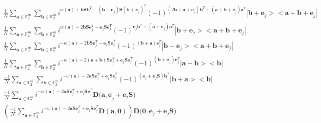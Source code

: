 \documentclass{article}
\begin{document}
\begin{align*}
	&\frac{1}{N}\sum_{\mathbf{a} \in \mathbb{F}^m_2}{\sum_{\mathbf{b} \in \mathbb{F}^m_2}{i^{w(\mathbf{a})+\mathbf{b S b}^T -(\mathbf{b+e}_j)\mathbf{S}(\mathbf{b+e}_j)^T} (-1)^{(2\mathbf{b}+\mathbf{a+e}_j)\mathbf{b}^T+(\mathbf{a+b+e}_j)\mathbf{a}^T} |\mathbf{b+e}_j> <\mathbf{a+b+e}_j |    } } \\
	&\frac{1}{N}\sum_{\mathbf{a} \in \mathbb{F}^m_2}{\sum_{\mathbf{b} \in \mathbb{F}^m_2}{i^{w(\mathbf{a})-2\mathbf{b S }\mathbf{e}_j^T-\mathbf{e}_j \mathbf{S e}_j^T} (-1)^{\mathbf{e}_j\mathbf{b}^T+(\mathbf{a+e}_j)\mathbf{a}^T} |\mathbf{b+e}_j> <\mathbf{a+b+e}_j |    } }\\
	&\frac{1}{N}\sum_{\mathbf{a} \in \mathbb{F}^m_2}{\sum_{\mathbf{b} \in \mathbb{F}^m_2}{i^{-w(\mathbf{a})-2\mathbf{b S }\mathbf{e}_j^T-\mathbf{e}_j \mathbf{S e}_j^T} (-1)^{(\mathbf{b+a})\mathbf{e}_j^T} |\mathbf{b+e}_j> <\mathbf{a+b+e}_j |    } } \\
	& \frac{1}{N}\sum_{\mathbf{a} \in \mathbb{F}^m_2}{\sum_{\mathbf{b} \in \mathbb{F}^m_2}{i^{-w(\mathbf{a})-2\mathbf{(a+b) S }\mathbf{e}_j^T+\mathbf{e}_j \mathbf{S e}_j^T} (-1)^{(\mathbf{b+e}_j)\mathbf{e}_j^T} |\mathbf{a+b}> <\mathbf{b} |    } } \\
	& \frac{-1}{N}\sum_{\mathbf{a} \in \mathbb{F}^m_2}{\sum_{\mathbf{b} \in \mathbb{F}^m_2}{i^{-w(\mathbf{a})-2\mathbf{a S }\mathbf{e}_j^T+\mathbf{e}_j \mathbf{S e}_j^T} (-1)^{(\mathbf{e}_j+\mathbf{e}_j\mathbf{S})\mathbf{b}^T} |\mathbf{b+a}> <\mathbf{b} |    } } \\
		& \frac{-1}{N}\sum_{\mathbf{a} \in \mathbb{F}^m_2}{i^{-w(\mathbf{a})-2\mathbf{a S }\mathbf{e}_j^T+\mathbf{e}_j \mathbf{S e}_j^T} \mathbf{D(a,e}_j+\mathbf{e}_j\mathbf{S})   }\\
			& \left(\frac{-1}{N}\sum_{\mathbf{a} \in \mathbb{F}^m_2}{i^{-w(\mathbf{a})-2\mathbf{a S }\mathbf{e}_j^T+\mathbf{e}_j \mathbf{S e}_j^T} \mathbf{D(a,0)}} \right) \mathbf{D(0},\mathbf{e}_j+\mathbf{e}_j \mathbf{S})
\end{align*}
\\
	
\end{document}
